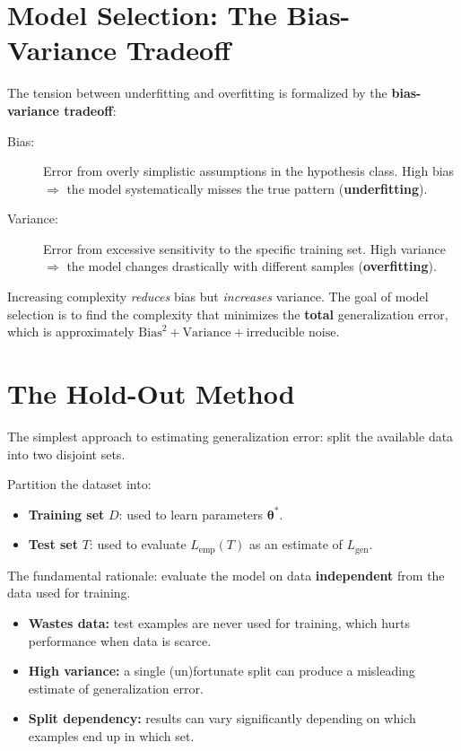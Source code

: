 \section*{Model Selection: The Bias-Variance Tradeoff}

The tension between underfitting and overfitting is formalized by the \textbf{bias-variance tradeoff}:

\begin{description}
    \item[Bias:] Error from overly simplistic assumptions in the hypothesis class. High bias $\Rightarrow$ the model systematically misses the true pattern (\textbf{underfitting}).
    \item[Variance:] Error from excessive sensitivity to the specific training set. High variance $\Rightarrow$ the model changes drastically with different samples (\textbf{overfitting}).
\end{description}

Increasing complexity \textit{reduces} bias but \textit{increases} variance. The goal of model selection is to find the complexity that minimizes the \textbf{total} generalization error, which is approximately $\text{Bias}^2 + \text{Variance} + \text{irreducible noise}$.

\section*{The Hold-Out Method}

The simplest approach to estimating generalization error: split the available data into two disjoint sets.

\begin{definition}
Partition the dataset into:
\begin{itemize}
    \item \textbf{Training set} $D$: used to learn parameters $\boldsymbol{\theta}^*$.
    \item \textbf{Test set} $T$: used to evaluate $L_{\text{emp}}(T)$ as an estimate of $L_{\text{gen}}$.
\end{itemize}
The fundamental rationale: evaluate the model on data \textbf{independent} from the data used for training.
\end{definition}

\begin{remark}
\begin{itemize}
    \item \textbf{Wastes data:} test examples are never used for training, which hurts performance when data is scarce.
    \item \textbf{High variance:} a single (un)fortunate split can produce a misleading estimate of generalization error.
    \item \textbf{Split dependency:} results can vary significantly depending on which examples end up in which set.
\end{itemize}
\end{remark}


